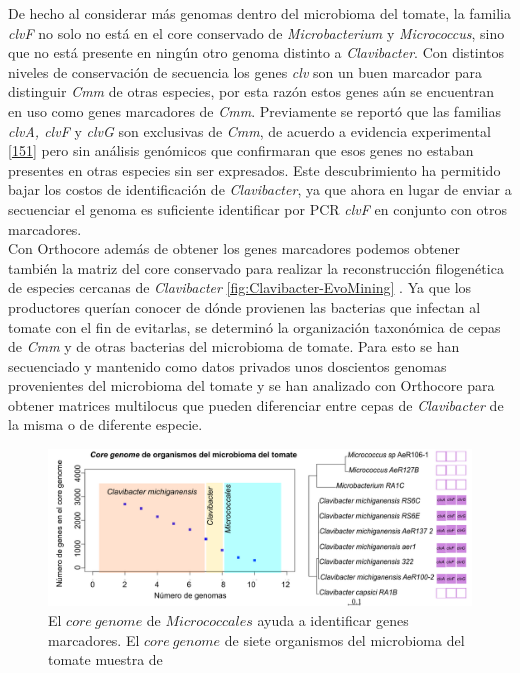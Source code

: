 \documentclass[12pt,twoside]{reedthesis}
\begin{document}
  De hecho al considerar más genomas dentro del microbioma del tomate, la
  familia \emph{clvF} no solo no está en el core conservado de
  \emph{Microbacterium} y \emph{Micrococcus}, sino que no está presente en
  ningún otro genoma distinto a \emph{Clavibacter}. Con distintos niveles
  de conservación de secuencia los genes \emph{clv} son un buen marcador
  para distinguir \emph{Cmm} de otras especies, por esta razón estos genes
  aún se encuentran en uso como genes marcadores de \emph{Cmm}.
  Previamente se reportó que las familias \emph{clvA, clvF} y \emph{clvG}
  son exclusivas de \emph{Cmm}, de acuerdo a evidencia experimental
  {[}\protect\hyperlink{ref-yasuhara-bell_genes_2014}{151}{]} pero sin
  análisis genómicos que confirmaran que esos genes no estaban presentes
  en otras especies sin ser expresados. Este descubrimiento ha permitido
  bajar los costos de identificación de \emph{Clavibacter}, ya que ahora
  en lugar de enviar a secuenciar el genoma es suficiente identificar por
  PCR \emph{clvF} en conjunto con otros marcadores.\\
  Con Orthocore además de obtener los genes marcadores podemos obtener
  también la matriz del core conservado para realizar la reconstrucción
  filogenética de especies cercanas de \emph{Clavibacter}
  \autoref{fig:Clavibacter-EvoMining} . Ya que los productores querían
  conocer de dónde provienen las bacterias que infectan al tomate con el
  fin de evitarlas, se determinó la organización taxonómica de cepas de
  \emph{Cmm} y de otras bacterias del microbioma de tomate. Para esto se
  han secuenciado y mantenido como datos privados unos doscientos genomas
  provenientes del microbioma del tomate y se han analizado con Orthocore
  para obtener matrices multilocus que pueden diferenciar entre cepas de
  \emph{Clavibacter} de la misma o de diferente especie.
  
  \begin{figure}[h!tbp]
  \centering
  \includegraphics[angle = 0,scale = .7]{chapter1/CoreGenomeMicrobioma.pdf}
  \caption[El $core~genome$ de $Micrococcales$ ayuda a identificar genes marcadores ]{\footnotesize{El $core~genome$ de $Micrococcales$ ayuda a identificar genes marcadores. El $core~genome$ de siete organismos del microbioma del tomate muestra  de }}
  \label{fig:Clavibacter-EvoMining}
  \end{figure}
  
\end{document}
